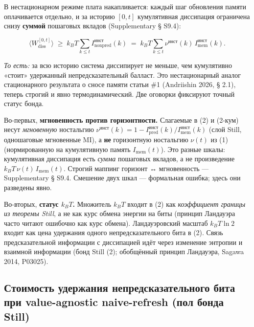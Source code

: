 \documentclass[pdflatex,sn-mathphys-ay]{sn-jnl}
\begin{document}
В нестационарном режиме плата накапливается: каждый шаг обновления памяти оплачивается отдельно, и за историю \([0,t]\) кумулятивная диссипация ограничена снизу \textbf{суммой} пошаговых вкладов (Supplementary § S9.4):



\begin{equation}\Big\langle W_{\text{diss}}^{[0,t]}\Big\rangle \;\ge\; k_B T \sum_{k \le t} I_{\text{nonpred}}^{\text{инст}}(k) \;=\; k_B T \sum_{k \le t} \nu^{\text{инст}}(k)\, I_{\text{mem}}^{\text{инст}}(k). \tag{2-кум}\end{equation}



\emph{То есть:} за всю историю система диссипирует не меньше, чем кумулятивно «стоит» удержанный непредсказательный балласт. Это нестационарный аналог стационарного результата о сносе памяти статьи \#1 (Andriishin 2026, § 2.1), теперь строгий и явно термодинамический. Две оговорки фиксируют точный статус бонда.



Во-первых, \textbf{мгновенность против горизонтности.} Слагаемые в (2) и (2-кум) несут \emph{мгновенную} ностальгию \(\nu^{\text{инст}}(k) = 1 - I_{\text{pred}}^{\text{инст}}(k)/I_{\text{mem}}^{\text{инст}}(k)\) (слой Still, одношаговые мгновенные MI), а \textbf{не} горизонтную ностальгию \(\nu(t)\) из (1) (нормированную на кумулятивную память \(I_{\text{mem}}(t)\)). Это разные шкалы: кумулятивная диссипация есть \emph{сумма} пошаговых вкладов, а не произведение \(k_B T\, \nu(t)\, I_{\text{mem}}(t)\). Строгий маппинг горизонт ↔ мгновенность --- Supplementary § S9.4. Смешение двух шкал --- формальная ошибка; здесь они разведены явно.



Во-вторых, \textbf{статус \(k_B T\).} Множитель \(k_B T\) входит в (2) как \emph{коэффициент границы из теоремы Still}, а не как курс обмена энергии на биты (принцип Ландауэра часто читают ошибочно как курс обмена). Ландауэровский масштаб \(k_B T \ln 2\) входит как цена удержания одного непредсказательного бита в (2). Связь предсказательной информации с диссипацией идёт через изменение энтропии и взаимной информации (бонд Still (2); обобщённый принцип Ландауэра, Sagawa 2014, P03025).



\subsection{Стоимость удержания непредсказательного бита при value-agnostic naive-refresh (пол бонда Still)}\label{ux441ux442ux43eux438ux43cux43eux441ux442ux44c-ux443ux434ux435ux440ux436ux430ux43dux438ux44f-ux43dux435ux43fux440ux435ux434ux441ux43aux430ux437ux430ux442ux435ux43bux44cux43dux43eux433ux43e-ux431ux438ux442ux430-ux43fux440ux438-value-agnostic-naive-refresh-ux43fux43eux43b-ux431ux43eux43dux434ux430-still}
\end{document}

